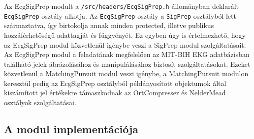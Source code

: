 \documentclass[oneside,titlepage,12pt,a4paper]{report}
\begin{document}
\par Az EcgSigPrep modult a \texttt{/src/headers/EcgSigPrep.h} állományban deklarált \linebreak \texttt{EcgSigPrep} osztály alkotja. Az \texttt{EcgSigPrep} osztály a \texttt{SigPrep} osztályból lett származtatva, így birtokolja annak minden protected, illetve publikus hozzáférhetőségű adattagját és függvényét. Ez egyben úgy is értelmezhető, hogy az EcgSigPrep modul közvetlenül igénybe veszi a SigPrep modul szolgáltatásait. Az EcgSigPrep modul a feladatának megfelelően az MIT-BIH EKG adatbázisban található jelek ábrázolásához és manipulálásához biztosít szolgáltatásokat. Ezeket közvetlenül a MatchingPursuit modul veszi igénybe, a MatchingPursuit modulon keresztül pedig az EcgSigPrep osztályból példányosított objektumok által kiszámított jel értékekre támaszkodnak az OrtCompresser és NelderMead osztályok szolgáltatásai. 

\subsection*{A modul implementációja}
\end{document}
